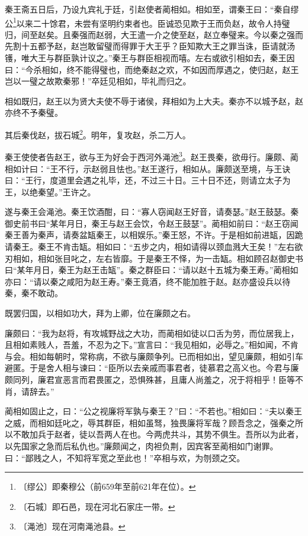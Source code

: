 \documentclass[12pt,UTF-8,openany]{ctexbook}
\begin{document}
\begin{normalsize}
    秦王斋五日后，乃设九宾礼于廷，引赵使者蔺相如。相如至，谓秦王曰：“秦自缪公\footnote{〔缪公〕即秦穆公（前659年至前621年在位）。}以来二十馀君，未尝有坚明约束者也。臣诚恐见欺于王而负赵，故令人持璧归，间至赵矣。且秦强而赵弱，大王遣一介之使至赵，赵立奉璧来。今以秦之强而先割十五都予赵，赵岂敢留璧而得罪于大王乎？臣知欺大王之罪当诛，臣请就汤镬，唯大王与群臣孰计议之。”秦王与群臣相视而嘻。左右或欲引相如去，秦王因曰：“今杀相如，终不能得璧也，而绝秦赵之欢，不如因而厚遇之，使归赵，赵王岂以一璧之故欺秦邪！”卒廷见相如，毕礼而归之。
    
    相如既归，赵王以为贤大夫使不辱于诸侯，拜相如为上大夫。秦亦不以城予赵，赵亦终不予秦璧。
    
    其后秦伐赵，拔石城\footnote{〔石城〕即石邑，现在河北石家庄一带。}。明年，复攻赵，杀二万人。
    
    秦王使使者告赵王，欲与王为好会于西河外渑池\footnote{〔渑池〕现在河南渑池县。}。赵王畏秦，欲毋行。廉颇、蔺相如计曰：“王不行，示赵弱且怯也。”赵王遂行，相如从。廉颇送至境，与王诀曰：“王行，度道里会遇之礼毕，还，不过三十日。三十日不还，则请立太子为王，以绝秦望。”王许之。
    
    遂与秦王会渑池。秦王饮酒酣，曰：“寡人窃闻赵王好音，请奏瑟。”赵王鼓瑟。秦御史前书曰“某年月日，秦王与赵王会饮，令赵王鼓瑟”。蔺相如前曰：“赵王窃闻秦王善为秦声，请奏盆缻秦王，以相娱乐。”秦王怒，不许。于是相如前进缻，因跪请秦王。秦王不肯击缻。相如曰：“五步之内，相如请得以颈血溅大王矣！”左右欲刃相如，相如张目叱之，左右皆靡。于是秦王不怿，为一击缻。相如顾召赵御史书曰“某年月日，秦王为赵王击缻”。秦之群臣曰：“请以赵十五城为秦王寿。”蔺相如亦曰：“请以秦之咸阳为赵王寿。”秦王竟酒，终不能加胜于赵。赵亦盛设兵以待秦，秦不敢动。
    
    既罢归国，以相如功大，拜为上卿，位在廉颇之右。
    
    廉颇曰：“我为赵将，有攻城野战之大功，而蔺相如徒以口舌为劳，而位居我上，且相如素贱人，吾羞，不忍为之下。”宣言曰：“我见相如，必辱之。”相如闻，不肯与会。相如每朝时，常称病，不欲与廉颇争列。已而相如出，望见廉颇，相如引车避匿。于是舍人相与谏曰：“臣所以去亲戚而事君者，徒慕君之高义也。今君与廉颇同列，廉君宣恶言而君畏匿之，恐惧殊甚，且庸人尚羞之，况于将相乎！臣等不肖，请辞去。”
    
    蔺相如固止之，曰：“公之视廉将军孰与秦王？”曰：“不若也。”相如曰：“夫以秦王之威，而相如廷叱之，辱其群臣，相如虽驽，独畏廉将军哉？顾吾念之，强秦之所以不敢加兵于赵者，徒以吾两人在也。今两虎共斗，其势不俱生。吾所以为此者，以先国家之急而后私仇也。”廉颇闻之，肉袒负荆，因宾客至蔺相如门谢罪。曰：“鄙贱之人，不知将军宽之至此也！”卒相与欢，为刎颈之交。
\end{normalsize}
\end{document}
